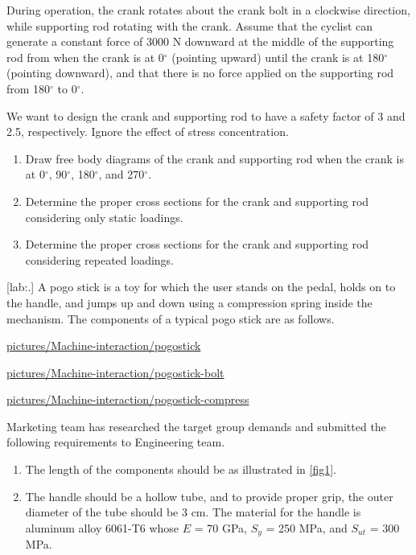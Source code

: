 \documentclass[a4paper,openany,12pt]{book}
\begin{document}
{{During operation, the crank rotates about the crank bolt in a clockwise
direction, while supporting rod rotating with the crank. Assume that the
cyclist can generate a constant force of 3000 N downward at the middle
of the supporting rod from when the crank is at 0\(^{\circ}\) (pointing
upward) until the crank is at 180\(^{\circ}\) (pointing downward), and
that there is no force applied on the supporting rod from 180\(^{\circ}\)
to 0\(^{\circ}\).

We want to design the crank and supporting rod to have a safety factor
of 3 and 2.5, respectively. Ignore the effect of stress concentration.

\begin{enumerate}
\item Draw free body diagrams of the crank and supporting rod when the
crank is at 0\(^{\circ}\), 90\(^{\circ}\), 180\(^{\circ}\), and
270\(^{\circ}\).

\item Determine the proper cross sections for the crank and supporting rod
considering only static loadings.

\item Determine the proper cross sections for the crank and supporting rod
considering repeated loadings.
\end{enumerate}

[lab:.] A pogo stick is a toy for
which the user stands on the pedal, holds on to the handle, and jumps up
and down using a compression spring inside the mechanism. The components
of a typical pogo stick are as follows.


\url{pictures/Machine-interaction/pogostick}

\hfill

\url{pictures/Machine-interaction/pogostick-bolt}

\url{pictures/Machine-interaction/pogostick-compress}

Marketing team has researched the target group demands and submitted the
following requirements to Engineering team.

\begin{enumerate}
\item The length of the components should be as illustrated in
\ref{fig1}.

\item The handle should be a hollow tube, and to provide proper grip, the
outer diameter of the tube should be 3 cm. The material for the
handle is aluminum alloy 6061-T6 whose \(E\) = 70 GPa, \(S_y\) = 250 MPa,
and \(S_{ut}\) = 300 MPa.


\end{enumerate}}}
\end{document}
